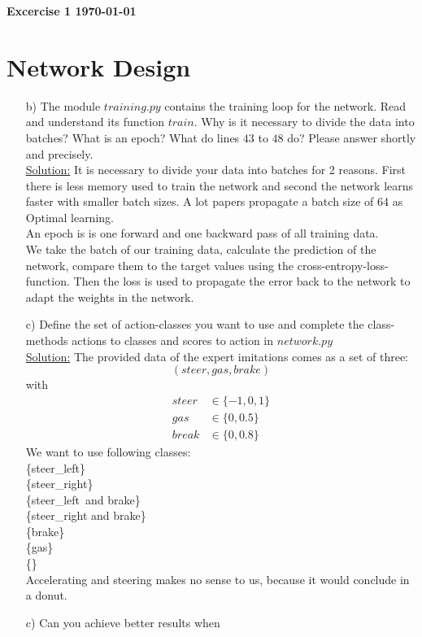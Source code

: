 \documentclass[DIN, pagenumber=false, fontsize=11pt, parskip=half]{scrartcl}
\newcommand{\mytitle}[1]{{\noindent\textbf{#1}}}
\newcommand{\sol}{\underline{Solution:} }
\begin{document}
\mytitle{{\huge Excercise 1} \hfill \today}
\section{Network Design }
\begin{enumerate}[b)]
	\item[b)]The module $training.py$ contains the training loop for the network. Read and understand its
	function $train$. Why is it necessary to divide the data into batches? What is an epoch? What do
	lines $43$ to $48$ do? Please answer shortly and precisely.\\
	\sol It is necessary to divide your data into batches for 2 reasons. First there is less memory used to train the network and second the network learns faster with smaller batch sizes. A lot papers propagate a batch size of 64 as Optimal learning.\\
	An epoch is is one forward and one backward pass of all training data.\\
	We take the batch of our training data, calculate the prediction of the network, compare them to the target values using the cross-entropy-loss-function. Then the loss is used to propagate the error back to the network to adapt the weights in the network. 
	\item[c)] Define the set of action-classes you want to use and complete the class-methods actions to classes
	and scores to action in $network.py$\\
	\sol The provided data of the expert imitations comes as a set of three:
	\[(steer,gas,brake)\]
	with
	\begin{align*}
		steer&\in\{-1,0,1\}\\
		gas&\in \{0,0.5\}\\
		break&\in \{0,0.8\}
	\end{align*}
	We want to use following classes:\\ 
		\{steer\_left\}\\
		\{steer\_right\}\\
		\{steer\_left\ and brake\}\\
		\{steer\_right and brake\}\\		
		\{brake\}\\
		\{gas\}\\
		\{\}\\
		Accelerating and steering makes no sense to us, because it would conclude in a donut. 
	\item[c)] Can you achieve better results when

\end{enumerate}
\end{document}
